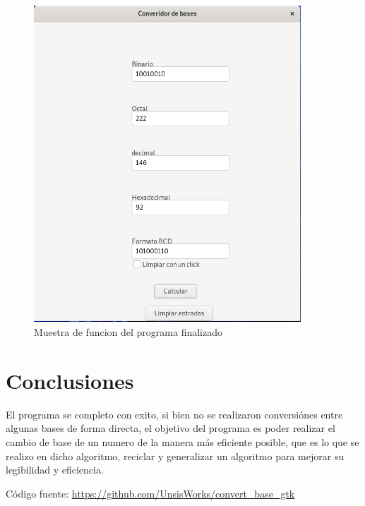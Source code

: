 \documentclass[letterpaper,12pt]{extarticle}%
\begin{document}
		\begin{figure}[H]
		\begin{center}
		\includegraphics[width=10cm]{imag//programFuntion.png}
		\caption{Muestra de funcion del programa finalizado}
		\label{programFuntion}
		\end{center}
		\end{figure}

	    
	    \section{Conclusiones}
		El programa se completo con exito, si bien no se realizaron conversiónes entre algunas bases
		de forma directa, el objetivo del programa es poder realizar el cambio de base de un numero de
		la manera más eficiente posible, que es lo que se realizo en dicho algoritmo, reciclar y generalizar
		un algoritmo para mejorar su legibilidad y eficiencia.
		
		Código fuente: \url{https://github.com/UnsisWorks/convert_base_gtk}
    
	\newpage
	
	


	\cfoot{\LaTeX}
\end{document}
